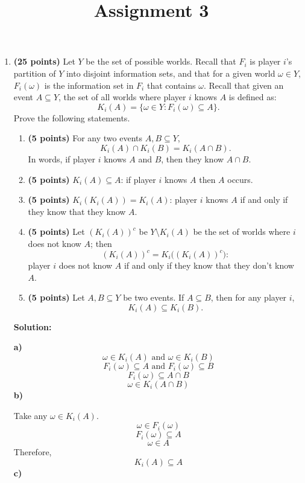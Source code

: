 \documentclass[11pt]{article}
\title{Assignment 3}
\author{}
\date{}
\begin{document}
\maketitle

\begin{enumerate}[label=\textbf{\arabic*.}, leftmargin=*]

\item \textbf{(25 points)} Let $Y$ be the set of possible worlds. Recall that $F_i$ is player $i$'s partition of $Y$ into disjoint information sets, and that for a given world $\omega \in Y$, $F_i(\omega)$ is the information set in $F_i$ that contains $\omega$. Recall that given an event $A \subseteq Y$, the set of all worlds where player $i$ knows $A$ is defined as:
\[
    K_i(A) = \{\omega \in Y : F_i(\omega) \subseteq A\}.
\]
Prove the following statements.

\begin{enumerate}[label=(\alph*)]
    \item \textbf{(5 points)} For any two events $A, B \subseteq Y$,
    \[
        K_i(A) \cap K_i(B) = K_i(A \cap B).
    \]
    In words, if player $i$ knows $A$ and $B$, then they know $A \cap B$.

    \item \textbf{(5 points)} $K_i(A) \subseteq A$: if player $i$ knows $A$ then $A$ occurs.

    \item \textbf{(5 points)} $K_i(K_i(A)) = K_i(A)$: player $i$ knows $A$ if and only if they know that they know $A$.

    \item \textbf{(5 points)} Let $(K_i(A))^c$ be $Y \setminus K_i(A)$ be the set of worlds where $i$ does not know $A$; then
    \[
        (K_i(A))^c = K_i\bigl((K_i(A))^c\bigr):
    \]
    player $i$ does not know $A$ if and only if they know that they don't know $A$.

    \item \textbf{(5 points)} Let $A, B \subseteq Y$ be two events. If $A \subseteq B$, then for any player $i$,
    \[
        K_i(A) \subseteq K_i(B).
    \]
\end{enumerate}

\textbf{Solution:}

\textbf{a)}
\[
\omega \in K_i(A) \text{ and } \omega \in K_i(B)
\]
\[
F_i(\omega) \subseteq A \text{ and } F_i(\omega) \subseteq B
\]
\[
F_i(\omega) \subseteq A \cap B
\]
\[
\omega \in K_i(A \cap B)
\]
\textbf{b)}

Take any \(\omega \in K_i(A)\).
\[\omega \in F_i(\omega)\]
\[
F_i(\omega) \subseteq A
\]
\[
\omega \in A
\]
Therefore,
\[
K_i(A) \subseteq A
\]
\textbf{c)}


\end{enumerate}
\end{document}
